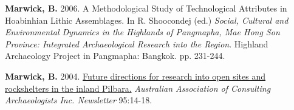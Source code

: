 \documentclass[11pt,article,oneside]{memoir}
\begin{document}
\ind \textbf{Marwick, B.} 2006. A Methodological Study of Technological Attributes in Hoabinhian Lithic Assemblages. In R. Shoocondej (ed.)  \textit{Social, Cultural and Environmental Dynamics in the Highlands of Pangmapha, Mae Hong Son Province: Integrated Archaeological Research into the Region}. Highland Archaeology Project in Pangmapha: Bangkok. pp. 231-244. 

\ind \textbf{Marwick, B.} 2004. \href{http://faculty.washington.edu/bmarwick/PDFs/Marwick_2004_AACAI.pdf}{Future directions for research into open sites and rockshelters in the inland Pilbara.} \textit{Australian Association of Consulting Archaeologists Inc. Newsletter} 95:14-18.
\end{document}
